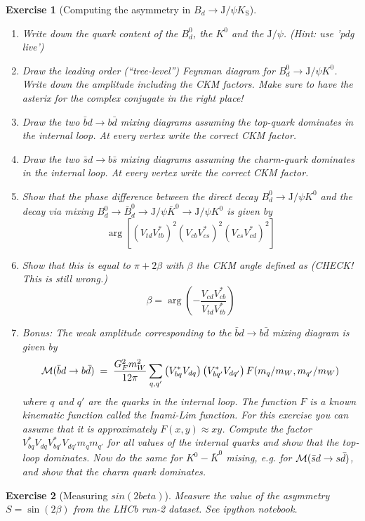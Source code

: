 \documentclass{article}
\newtheorem{homeworkexercise}{Exercise}
\newenvironment{enumexercise}{
  \renewcommand{\labelenumi}{\bfseries{(\alph{enumi})}}
  \leavevmode\begin{enumerate}}{\end{enumerate}\vspace{5pt}}
\newcommand{\jpsi}{\ensuremath{\mathrm{J/}\psi}}
\newcommand{\Ks}{\ensuremath{K_\text{S}}}
\begin{document}
\begin{homeworkexercise}[Computing the asymmetry in $B_d \to \jpsi\Ks$]
  \begin{enumexercise}
  \item Write down the quark content of the $B^0_d$, the $K^0$ and the $\jpsi$. (Hint: use 'pdg live')
    
  \item Draw the leading order (``tree-level'') Feynman diagram for $B_d^0 \to \jpsi K^0$. Write down the amplitude including the CKM factors. Make sure to have the asterix for the complex conjugate in the right place!
  \item Draw the two $\bar{b}{d} \to b\bar{d}$ mixing diagrams assuming the top-quark dominates in the internal loop. At every vertex write the correct CKM factor. 
  \item Draw the two $\bar{s}{d} \to b\bar{s}$ mixing diagrams assuming the charm-quark dominates in the internal loop. At every vertex write the correct CKM factor.
  \item Show that the phase difference between the direct decay $B^0_d \to \jpsi K^0$ and the decay via mixing $B^0_d \to \bar{B}^0_d \to \jpsi \bar{K}^0 \to  \jpsi K^0$ is given by
    \[
      \arg\left[ \left( V_{td} V_{tb}^* \right)^2 \left( V_{cb} V_{cs}^*\right)^2 \left(V_{cs} V_{cd}^*\right)^2 \right]
    \]
  \item Show that this is equal to $\pi + 2\beta$ with $\beta$ the CKM angle defined as (CHECK! This is still wrong.)
    \[
      \beta = \arg\left( - \frac{V_{cd} V_{cb}^*}{V_{td} V_{tb}^*} \right)
    \]
  \item Bonus: The weak amplitude corresponding to the $\bar{b}{d} \to b\bar{d}$  mixing diagram is given by
    \[
      {\cal M}( \bar{b}{d} \to b\bar{d} ) \; = \; \frac{G_F^2 m_W^2}{12\pi} 
      \sum_{q,q'}
      \left(V_{bq}^* V_{dq}\right) \left(V_{bq'}^* V_{dq'}\right)  
      F( m_q/m_W, m_{q'}/m_W )
    \]
    where $q$ and $q'$ are the quarks in the internal loop. The function $F$ is a known kinematic function called the Inami-Lim function. For this exercise you can assume that it is approximately $F(x,y) \approx x y$. Compute the factor $ V_{bq}^* V_{dq} V_{bq'}^* V_{dq'} m_q m_{q'}$ for all values of the internal quarks and show that the top-loop dominates. Now do the same for $K^0 - \bar{K}^0$ mising, e.g. for ${\cal M}( \bar{s}{d} \to s\bar{d} )$, and show that the charm quark dominates.
    \end{enumexercise}
    
\end{homeworkexercise}


\begin{homeworkexercise}[Measuring $sin(2beta)$]

  Measure the value of the asymmetry $S = \sin(2\beta)$ from the LHCb run-2 dataset. See ipython notebook.
  
\end{homeworkexercise}
\end{document}
